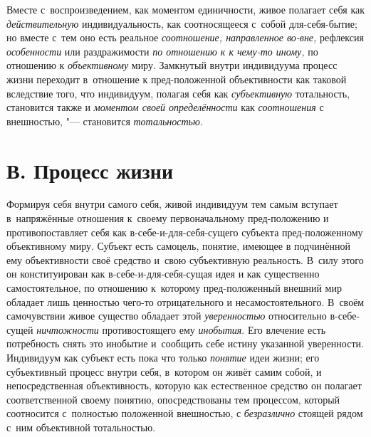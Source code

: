 Вместе с~воспроизведением, как моментом единичности, живое
полагает себя как {\em действительную}
индивидуальность, как соотносящееся с~собой для-себя-бытие;
но вместе с~тем оно есть реальное
{\em соотношение, направленное во-вне,}
рефлексия
{\em особенности} или
раздражимости {\em по отношению к
к чему-то иному,} по отношению к
{\em объективному} миру.
Замкнутый внутри индивидуума процесс жизни переходит в~отношение к
пред-положенной объективности как таковой вследствие того, что
индивидуум, полагая себя как
{\em субъективную}
тотальность, становится также и
{\em моментом своей определённости}
как {\em соотношения}
с внешностью, "--- становится
{\em тотальностью}.

\section[В. Процесс жизни]{В. Процесс жизни}

Формируя себя внутри самого себя, живой индивидуум тем самым
вступает в~напряжённые отношения к~своему первоначальному пред-положению и
противопоставляет себя как в-себе-и-для-себя-сущего субъекта
пред-положенному объективному миру. Субъект есть самоцель, понятие, имеющее
в подчинённой ему объективности своё средство и~свою субъективную
реальность. В~силу этого он конституирован как в-себе-и-для-себя-сущая идея
и как существенно самостоятельное, по отношению к~которому пред-положенный
внешний мир обладает лишь ценностью чего-то отрицательного и
несамостоятельного. В~своём самочувствии живое существо обладает этой
{\em уверенностью}
относительно в-себе-сущей
{\em ничтожности}
противостоящего ему
{\em инобытия}. Его
влечение есть потребность снять это инобытие и~сообщить себе истину
указанной уверенности. Индивидуум как субъект есть пока что только
{\em понятие} идеи жизни;
его субъективный процесс внутри себя, в~котором он живёт самим собой, и
непосредственная объективность, которую как естественное средство он
полагает соответственной своему понятию, опосредствованы тем процессом,
который соотносится с~полностью положенной внешностью, с
{\em безразлично} стоящей
рядом с~ним объективной тотальностью.

